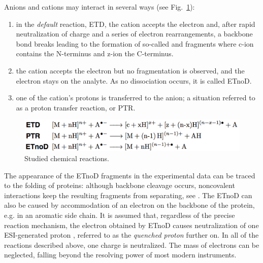 \documentclass{llncs}
\begin{document}
Anions and cations may interact in several ways (see Fig.~\ref{img::reactions}):
\begin{enumerate}
        \item in the \textit{default} reaction, ETD, the cation accepts the electron and, after rapid neutralization of charge and a series of electron rearrangements, a backbone  bond breaks leading to the formation of so-called  and  fragments where c-ion contains the N-terminus and z-ion the C-terminus.

        \item the cation accepts the electron but no fragmentation is observed, and the electron stays on the analyte. As no dissociation occurs, it is called ETnoD.

        \item one of the cation’s protons is transferred to the anion; a situation referred to as a proton transfer reaction, or PTR.
\end{enumerate}
\begin{figure}[h]\centering
        \includegraphics[width=\textwidth]{reactions.png}
        \caption{Studied chemical reactions.}\label{img::reactions}
\end{figure}



The appearance of the ETnoD fragments in the experimental data can be traced to the folding of proteins: although backbone cleavage occurs, noncovalent interactions keep the resulting fragments from separating, see \cite{Lermyte2014-vu,Lermyte2015-oy}. The ETnoD can also be caused by accommodation of an electron on the backbone of the protein, e.g. in an aromatic side chain. It is assumed that, regardless of the precise reaction mechanism, the electron obtained by ETnoD causes neutralization of one ESI-generated proton \cite{Lermyte2015-lm}, referred to as the \textit{quenched proton} further on. In all of the reactions described above, one charge is neutralized. The mass of electrons can be neglected, falling beyond the resolving power of most modern instruments.
\end{document}
